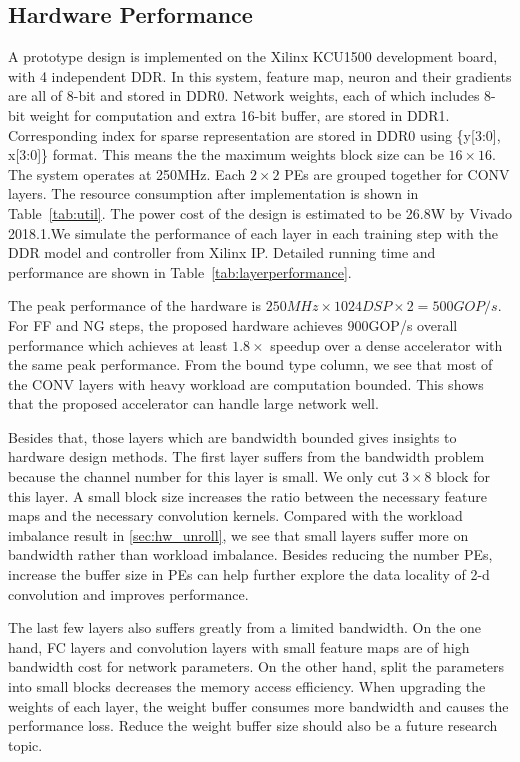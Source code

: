 

\subsection{Hardware Performance}
A prototype design is implemented on the Xilinx KCU1500 development board, with 4 independent DDR. In this system, feature map, neuron and their gradients are all of 8-bit and stored in DDR0. Network weights, each of which includes 8-bit weight for computation and extra 16-bit buffer, are stored in DDR1. Corresponding index for sparse representation are stored in DDR0 using \{y[3:0], x[3:0]\} format. This means the the maximum weights block size can be $16\times 16$. The system operates at 250MHz. Each $2\times 2$ PEs are grouped together for CONV layers. The resource consumption after implementation is shown in Table~\ref{tab:util}. The power cost of the design is estimated to be 26.8W by Vivado 2018.1.We simulate the performance of each layer in each training step with the DDR model and controller from Xilinx IP. Detailed running time and performance are shown in Table~\ref{tab:layerperformance}.  



The peak performance of the hardware is $250MHz \times 1024DSP \times 2 = 500GOP/s$. For FF and NG steps, the proposed hardware achieves 900GOP/s overall performance which achieves at least $1.8\times$ speedup over a dense accelerator with the same peak performance. From the bound type column, we see that most of the CONV layers with heavy workload are computation bounded. This shows that the proposed accelerator can handle large network well.

Besides that, those layers which are bandwidth bounded gives insights to hardware design methods. The first layer suffers from the bandwidth problem because the channel number for this layer is small. We only cut $3\times 8$ block for this layer. A small block size increases the ratio between the necessary feature maps and the necessary convolution kernels. Compared with the workload imbalance result in \ref{sec:hw_unroll}, we see that small layers suffer more on bandwidth rather than workload imbalance. Besides reducing the number PEs, increase the buffer size in PEs can help further explore the data locality of 2-d convolution and improves performance. 

The last few layers also suffers greatly from a limited bandwidth. On the one hand, FC layers and convolution layers with small feature maps are of high bandwidth cost for network parameters. On the other hand, split the parameters into small blocks decreases the memory access efficiency. When upgrading the weights of each layer, the weight buffer consumes more bandwidth and causes the performance loss. Reduce the weight buffer size should also be a future research topic. 

